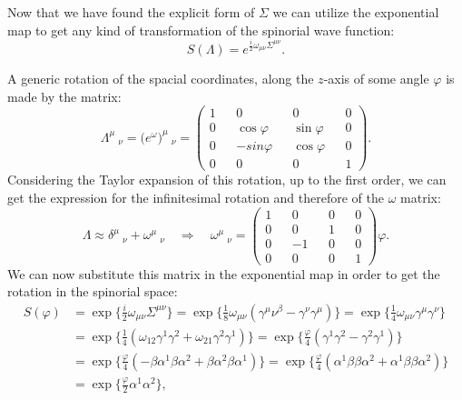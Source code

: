 Now that we have found the explicit form of $\Sigma$ we can utilize the exponential map to get any kind of transformation of the spinorial wave function:
\begin{equation*}
    S(\Lambda)=e^{\frac{i}{2}\omega_{\mu\nu}\Sigma^{\mu\nu}}.
\end{equation*}
\begin{example}
    A generic rotation of the spacial coordinates, along the $z$-axis of some angle $\varphi$ is made by the matrix:
    \begin{equation*}
        \Lambda^\mu\ _\nu=\big(e^\omega\big)^\mu\ _\nu=\begin{pmatrix}
            1&&0&&0&&0\\
            0&&\cos\varphi&&\sin\varphi&&0\\
            0&&-sin\varphi&&\cos\varphi&&0\\
            0&&0&&0&&1
        \end{pmatrix}.
    \end{equation*}
    Considering the Taylor expansion of this rotation, up to the first order, we can get the expression for the infinitesimal rotation and therefore of the $\omega$ matrix:
    \begin{equation*}
        \Lambda\approx\delta^\mu\ _\nu+\omega^\mu\ _\nu\quad\Rightarrow\quad
        \omega^\mu\ _\nu=\begin{pmatrix}
            1&&0&&0&&0\\
            0&&0&&1&&0\\
            0&&-1&&0&&0\\
            0&&0&&0&&1
        \end{pmatrix}\varphi.
    \end{equation*}
    We can now substitute this matrix in the exponential map in order to get the rotation in the spinorial space:
    \begin{align*}
        S(\varphi)&=\exp\bigg\{\frac{i}{2}\omega_{\mu\nu}\Sigma^{\mu\nu}\bigg\}=\exp\bigg\{\frac{1}{8}\omega_{\mu\nu}(\gamma^\mu\nu^\beta-\gamma^\nu\gamma^\mu)\bigg\}=\exp\bigg\{\frac{1}{4}\omega_{\mu\nu}\gamma^\mu\gamma^\nu\bigg\}\\&=\exp\bigg\{\frac{1}{4}(\omega_{12}\gamma^1\gamma^2+\omega_{21}\gamma^2\gamma^1)\bigg\}=\exp\bigg\{\frac{\varphi}{4}(\gamma^1\gamma^2-\gamma^2\gamma^1)\bigg\}\\&=\exp\bigg\{\frac{\varphi}{4}(-\beta\alpha^1\beta\alpha^2+\beta\alpha^2\beta\alpha^1)\bigg\}=\exp\bigg\{\frac{\varphi}{4}(\alpha^1\beta\beta\alpha^2+\alpha^1\beta\beta\alpha^2)\bigg\}\\&=\exp\bigg\{\frac{\varphi}{2}\alpha^1\alpha^2\bigg\},

\end{align*}
\end{example}
